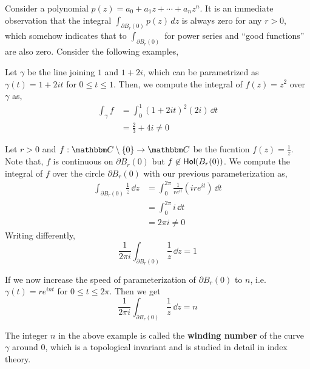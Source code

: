 \documentclass[../ComplexAnalysis_Notes.tex]{subfiles}
\begin{document}
Consider a polynomial \(p(z) = a_0 + a_1 z + \cdots + a_n z^n\). It is an immediate observation that the integral \(\int_{\partial B_r(0)} p(z) \,dz\) is always zero for any \(r > 0\), which somehow indicates that to \(\int_{\partial B_r(0)}\) for power series and ``good functions'' are also zero. Consider the following examples,

\begin{Eg}{}{}
  Let \(\gamma\) be the line joining \(1\) and \(1+2i\), which can be parametrized as \(\gamma(t) = 1 + 2it\) for \(0 \leq t \leq 1\). Then, we compute the integral of \(f(z) = z^2\) over \(\gamma\) as,
  \begin{align*}
    \int_\gamma f
     & = \int_0^1 (1 + 2it)^2 (2i) \, \dd{t} \\
     & = \frac{2}{3} + 4i \neq 0
  \end{align*}
\end{Eg}

\begin{Eg}{}{}
  Let \(r > 0\) and \(f : \C \setminus \{0\} \to \C\) be the fucntion \(f(z) = \frac 1z\). Note that, \(f\) is continuous on \(\partial B_r(0)\) but \(f \not\in \operatorname{\mathsf{Hol}}(B_r(0)) \). We compute the integral of \(f\) over the circle \(\partial B_r(0)\) with our previous parameterization as,
  \begin{align*}
    \int_{\partial B_r(0)} \frac 1z \, \dd{z}
     & = \int_0^{2\pi} \frac{1}{re^{it}} (ire^{it}) \, \dd{t} \\
     & = \int_0^{2\pi} i \, \dd{t}                            \\
     & = 2\pi i \neq 0
  \end{align*}
  Writing differently,
  \[
    \frac 1{2\pi i} \int_{\partial B_r(0)} \frac 1z \, \dd{z} = 1
  \]

  If we now increase the speed of parameterization of \(\partial B_r(0)\) to \(n\), i.e. \(\gamma(t) = re^{int}\) for \(0 \leq t \leq 2\pi\). Then we get
  \[
    \frac 1{2\pi i} \int_{\partial B_r(0)} \frac 1z \, \dd{z} = n
  \]
\end{Eg}

The integer \(n\) in the above example is called the \textbf{winding number} of the curve \(\gamma\) around \(0\), which is a topological invariant and is studied in detail in index theory.
\end{document}
